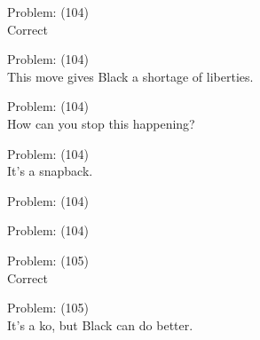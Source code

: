 \documentclass[11pt]{article}
\begin{document}
\begin{minipage}[t]{0.5\textwidth}
  {\centering
  
Problem: (104)\\
Correct\\
  }
\end{minipage}
\begin{minipage}[t]{0.5\textwidth}
  {\centering
  
Problem: (104)\\
This move gives Black a shortage of liberties.\\
  }
\end{minipage}
\begin{minipage}[t]{0.5\textwidth}
  {\centering
  
Problem: (104)\\
How can you stop this happening?\\
  }
\end{minipage}
\begin{minipage}[t]{0.5\textwidth}
  {\centering
  
Problem: (104)\\
It's a snapback.\\
  }
\end{minipage}
\begin{minipage}[t]{0.5\textwidth}
  {\centering
  
Problem: (104)\\
  }
\end{minipage}
\begin{minipage}[t]{0.5\textwidth}
  {\centering
  
Problem: (104)\\
  }
\end{minipage}
\begin{minipage}[t]{0.5\textwidth}
  {\centering
  
Problem: (105)\\
Correct\\
  }
\end{minipage}
\begin{minipage}[t]{0.5\textwidth}
  {\centering
  
Problem: (105)\\
It's a ko, but Black can do better.\\
  }
\end{minipage}
\end{document}
